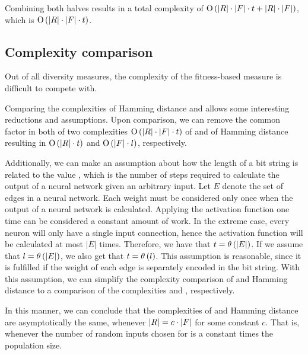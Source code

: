 Combining both halves results in a total complexity of $\operatorname{O}\left(\lvert R\rvert \cdot \lvert F\rvert \cdot t + \lvert R\rvert \cdot \lvert F\rvert\right)$, which is $\operatorname{O}\left(\lvert R\rvert\cdot\lvert F\rvert\cdot t\right)$.

\subsection{Complexity comparison}
Out of all diversity measures, the complexity of the fitness-based measure is difficult to compete with.

Comparing the complexities of Hamming distance and \dia{} allows some interesting reductions and assumptions. Upon comparison, we can remove the common factor \indset{} in both of two complexities $\operatorname{O}\left(\lvert R\rvert\cdot\lvert F\rvert\cdot t\right)$ of \dia{} and \bigO{\indsetl^2 \cdot \bitstringl} of Hamming distance resulting in $\operatorname{O}\left(\lvert R\rvert \cdot t\right)$ and $\operatorname{O}\left(\lvert F\rvert \cdot l\right)$, respectively. 

Additionally, we can make an assumption about how the length of a bit string \bitstringl{} is related to the value \timet, which is the number of steps required to calculate the output of a neural network given an arbitrary input. Let $E$ denote the set of edges in a neural network. Each weight must be considered only once when the output of a neural network is calculated. Applying the activation function one time can be considered a constant amount of work. In the extreme case, every neuron will only have a single input connection, hence the activation function will be calculated at most $|E|$ times. Therefore, we have that $t = \theta\left(\lvert E\rvert\right)$. If we assume that $l = \theta\left(\lvert E\rvert\right)$, we also get that $t = \theta\left(l\right)$. This assumption is reasonable, since it is fulfilled if the weight of each edge is separately encoded in the bit string. With this assumption, we can simplify the complexity comparison of \dia{} and Hamming distance to a comparison of the complexities \bigO{\ransetl} and \bigO{\indsetl}, respectively.

In this manner, we can conclude that the complexities of \dia{} and Hamming distance are asymptotically the same, whenever $\lvert R\rvert = c \cdot \lvert F\rvert$ for some constant $c$. That is, whenever the number of random inputs chosen for \dia{} is a constant times the population size.
